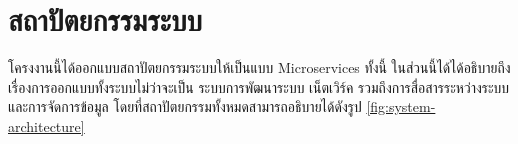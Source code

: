 \section{สถาปัตยกรรมระบบ}
โครงงานนี้ได้ออกแบบสถาปัตยกรรมระบบให้เป็นแบบ Microservices ทั้งนี้ ในส่วนนี้ได้ได้อธิบายถึงเรื่องการออกแบบทั้งระบบไม่ว่าจะเป็น ระบบการพัฒนาระบบ เน็ตเวิร์ค รวมถึงการสื่อสารระหว่างระบบ และการจัดการข้อมูล โดยที่สถาปัตยกรรมทั้งหมดสามารถอธิบายได้ดังรูป \ref{fig:system-architecture}

\clearpage
\begin{landscape}
\end{landscape}